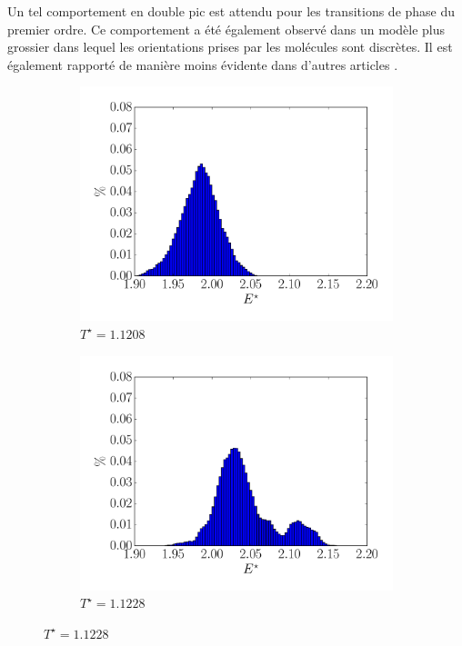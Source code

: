 \documentclass[11pt,a4paper]{article}
\numberwithin{equation}{section}
\begin{document}
Un tel comportement en double pic est attendu pour les transitions de phase du premier ordre. Ce comportement a été également observé dans un modèle plus grossier \cite{model} dans lequel les orientations prises par les molécules sont discrètes. Il est également rapporté de manière moins évidente dans d'autres articles \cite{fabbri}.

\begin{figure}
\center
    \begin{subfigure}[b]{0.49\textwidth}
    	\center
    	\includegraphics[scale=0.4]{figures/histo_11208.pdf}
    	\caption{$T^\star =1.1208$}
    	\label{11208}
    \end{subfigure}	
	\begin{subfigure}[b]{0.49\textwidth}
    	\center
    	\includegraphics[scale=0.4]{figures/histo_11228.pdf}
    	\caption{$T^\star =1.1228$}
    	\label{11228}
    \end{subfigure}
    

\end{figure}
\end{document}
